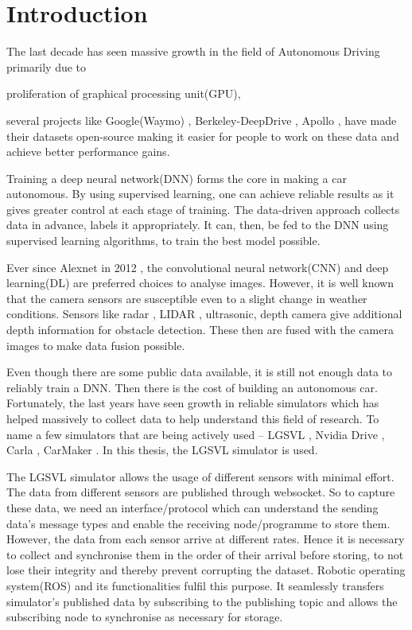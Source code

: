 \chapter{Introduction}

The last decade has seen massive growth in the field of Autonomous
Driving primarily due to 
\begin{enumerate*}[label= \alph*)]
    \item proliferation of graphical processing unit(GPU),

    \item several projects like Google(Waymo) \cite{Waymo},
        Berkeley-DeepDrive \cite{Berkeley-DeepDrive},
        Apollo \cite{Apollo}, have made their datasets open-source making it
        easier for people to work on these data and achieve better performance gains. 
\end{enumerate*}



Training a deep neural network(DNN) forms the core in making a car autonomous. 
By using supervised learning, one can achieve reliable results as it gives greater control
at each stage of training. The data-driven approach collects data in advance, labels it
appropriately. It can, then, be fed to the DNN using supervised
learning algorithms, to train the best model possible. 

Ever since Alexnet in 2012 \cite{Alexnet2012}, the convolutional neural network(CNN) and
deep learning(DL) are preferred choices to analyse images.  However, it is well known that the camera sensors are susceptible even to a slight change in weather conditions. 
 Sensors like radar \cite{Radar}, LIDAR \cite{LIDAR}, ultrasonic, depth camera
give additional depth information for obstacle detection. These then are fused with the camera images to make
data fusion possible. 

Even though there are some public data available, it is still not enough data to reliably
train a DNN. Then there is  the cost of building an autonomous car. Fortunately, the last
years have seen growth in reliable simulators which
has helped massively to collect data to help understand this field of research.
To name a few simulators that are being actively used -- LGSVL \cite{LGSVL}, Nvidia Drive
\cite{NvidiaSimulator}, Carla \cite{CarlaSimulator}, CarMaker \cite{CarMaker}. 
In this thesis, the LGSVL simulator is used.

The LGSVL simulator allows the usage of different sensors with minimal effort. The data
from different sensors are published through websocket. So to capture these data, we
need an interface/protocol which can understand the sending data's message types and enable the
receiving node/programme to store them. However, the data from each sensor arrive at
different rates. Hence it is necessary to collect and synchronise them in the order of their arrival
before storing, to not lose their integrity and thereby prevent corrupting the dataset.
Robotic operating system(ROS) \cite{ROS2} and its functionalities fulfil
this purpose. It seamlessly transfers simulator's published data by subscribing to the
publishing topic and allows the subscribing node to synchronise as necessary for storage.

